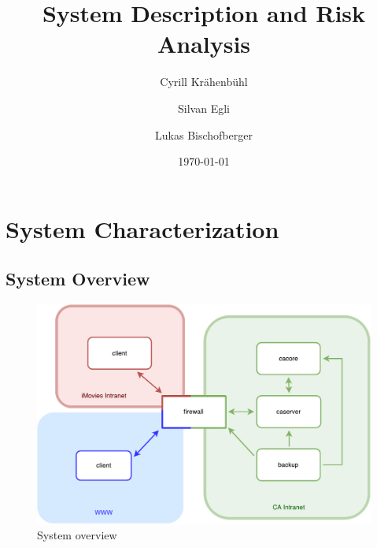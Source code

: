 \documentclass[english]{article}
\title{\huge\sffamily\bfseries System Description and Risk Analysis}
\author{Cyrill Kr\"ahenb\"uhl \and Silvan Egli \and Lukas Bischofberger}
\date{\today}
\begin{document}
\maketitle


\tableofcontents
\pagebreak


\section{System Characterization}

\subsection{System Overview}


\begin{figure}[ht]
	\centering
	\includegraphics[scale=0.5]{src/systemoverview.pdf}
	\caption{System overview}
	\label{figure:systemoverview}
\end{figure}
\end{document}
